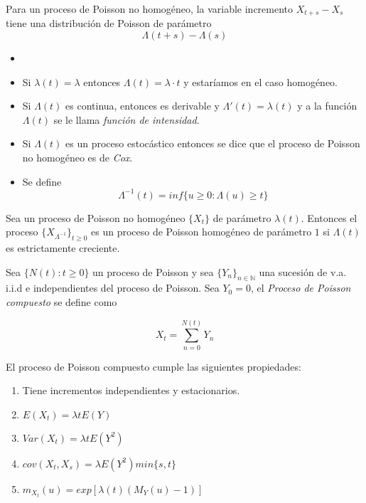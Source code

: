 \documentclass[PREyA.tex]{subfiles}
\begin{document}
\begin{prop}
	Para un proceso de Poisson no homogéneo, la variable incremento $X_{t+s}-X_{s}$ tiene una distribución de Poisson de parámetro $$\Lambda(t+s)-\Lambda(s)$$
\end{prop}
\begin{nota}
\begin{itemize}
\item[]
\item Si $\lambda(t)= \lambda$ entonces $\Lambda(t)= \lambda \cdot t$ y estaríamos en el caso homogéneo.
\item Si $\Lambda(t)$ es continua, entonces es derivable y $\Lambda'(t)=\lambda(t)$ y a la función $\Lambda(t)$ se le llama \textit{función de intensidad}.
\item Si $\Lambda(t)$ es un proceso estocástico entonces se dice que el proceso de Poisson no homogéneo es de \textit{Cox}.
\item Se define
	$$ \Lambda^{-1}(t) = inf \{ u \geq 0: \Lambda(u) \geq t \}$$ 
\end{itemize}
\end{nota}
\begin{prop}
	Sea un proceso de Poisson no homogéneo $\{X_{t} \}$ de parámetro $\lambda(t)$. Entonces el proceso $\{X_{\Lambda^{-1}}\}_{ t \geq 0}$  es un proceso de Poisson homogéneo de parámetro $1$ si $\Lambda(t)$ es estrictamente creciente.
\end{prop}



\begin{defi}
	Sea $\{ N(t) : t \geq 0 \}$ un proceso de Poisson y sea $\{ Y_{n} \}_{n \in \mathbb{N}}$ una sucesión de v.a. i.i.d e independientes del proceso de Poisson. Sea $Y_{0} = 0$, el \textit{Proceso de Poisson compuesto} se define como
	
	$$ X_{t} = \sum_{n=0}^{N(t)} Y_{n}$$
	
\end{defi}

\newpage
\begin{prop}
	El proceso de Poisson compuesto cumple las siguientes propiedades:
	\begin{enumerate}
		\item Tiene incrementos independientes y estacionarios.
		
		\item $E(X_{t}) = \lambda t E(Y)$
		
		\item $Var(X_{t}) = \lambda t E(Y^{2})$
		
		\item $cov(X_t, X_s) = \lambda E(Y^{2}) min\{s,t\}$
		
		\item $m_{X_{t}} (u) = exp[\lambda (t) (M_{Y} (u) -1)]$
	\end{enumerate}
\end{prop}
\end{document}
